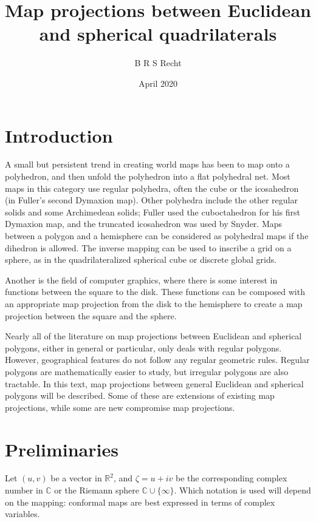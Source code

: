 \documentclass{amsart}[12pt]
\title{Map projections between Euclidean and spherical quadrilaterals}
\author{B R S Recht}
\date{April 2020}
\begin{document}
\maketitle
\tableofcontents

\section{Introduction}
A small but persistent trend in creating world maps has been to map onto a
polyhedron, and then unfold the polyhedron into a flat polyhedral net.
Most maps in this category use regular polyhedra, often the cube or the
icosahedron (in Fuller's second Dymaxion map).\cite{gray94} Other polyhedra include the other regular solids and
some Archimedean solids; Fuller used the cuboctahedron for his first Dymaxion
map,\cite{gray95} and the truncated icosahedron was used by
Snyder.\cite{snyder92} Maps between a polygon and a hemisphere
can be considered as polyhedral maps if the dihedron is
allowed.\cite{snyder89}\cite{lambers} The inverse mapping can be used to
inscribe a grid on a sphere, as in the quadrilateralized spherical
cube\cite{chan75}\cite{oneill76} or discrete global grids.\cite{sahr98}

Another is
the field of computer graphics, where there is some interest in functions
between the square to the disk.\cite{fong15}\cite{fong18}
These functions can be composed with an appropriate map
projection from the disk to the hemisphere
to create a map projection between the square and the sphere.\cite{lambers}

Nearly all of the literature on map projections between Euclidean and spherical
polygons, either in general or particular, only deals with regular polygons.
However, geographical features do not follow any regular geometric rules.
Regular polygons are mathematically easier to study, but irregular polygons are
also tractable. In this text, map projections between general Euclidean and
spherical polygons will be described. Some of these are extensions of existing
map projections, while some are new compromise map projections.

\section{Preliminaries}
Let $(u,v)$ be a vector in $\mathbb R^2$, and $\zeta = u + i v$ be the
corresponding complex number in $\mathbb C$ or the Riemann sphere $\mathbb C
\cup \{\infty\}$. Which notation is used will depend on the mapping:
conformal maps are best expressed in terms of complex variables.
\end{document}
